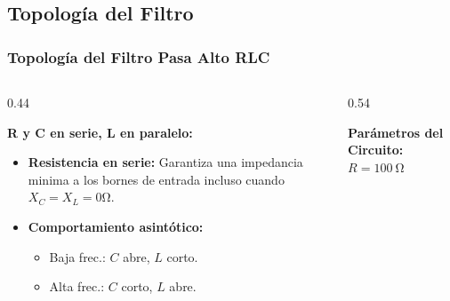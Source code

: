 \subsection{Topología del Filtro}
\begin{frame}
  \frametitle{Topología del Filtro Pasa Alto RLC}

  \begin{columns}[c, onlytextwidth]
    \begin{column}{0.44\textwidth}
      \begin{tarjeta}
        {\fontsize{8.5pt}{10.5pt}\selectfont \textbf{\color{NavyDark} R y C en serie, L en paralelo:}}\\[2pt]
        {\fontsize{7.5pt}{9.2pt}\selectfont
        \begin{itemize}\setlength{\itemsep}{2pt}
          \item \textbf{Resistencia en serie:} Garantiza una impedancia minima a los bornes de entrada incluso cuando
            $X_C = X_L = 0 \si{\ohm}$.
          \item \textbf{Comportamiento asintótico:}
          \begin{itemize}\setlength{\itemsep}{1pt}
            \fontsize{7.5pt}{9.2pt}\selectfont
            \item Baja frec.: $C$ abre, $L$ corto.
            \item Alta frec.: $C$ corto, $L$ abre.
          \end{itemize}
        \end{itemize}
        }
      \end{tarjeta}
    \end{column}

    \begin{column}{0.54\textwidth}
      \centering
      \vspace{4pt}
      \begin{tarjeta}[colframe=CardBorder, colback=CardBg, boxrule=0.5pt, top=3pt, bottom=1pt, left=5pt, right=5pt]
        {\fontsize{7.5pt}{9pt}\selectfont
        \textbf{\color{NavyDark} Parámetros del Circuito:} $R = \qty{100}{\ohm}$\\
        }
      \end{tarjeta}
    \end{column}
  \end{columns}
\end{frame}

